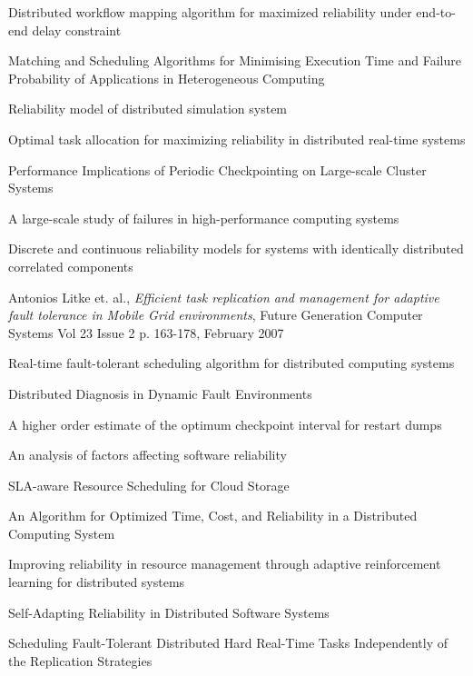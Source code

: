 \documentclass{cslthse-msc}
\begin{document}
\begin{thebibliography}{50}
Distributed workflow mapping algorithm for maximized reliability under end-to-end delay constraint

Matching and Scheduling Algorithms for Minimising Execution Time and Failure Probability of Applications in Heterogeneous Computing

Reliability model of distributed simulation system

Optimal task allocation for maximizing reliability in distributed real-time systems

Performance Implications of Periodic Checkpointing on Large-scale Cluster Systems

A large-scale study of failures in high-performance computing systems

Discrete and continuous reliability models for systems with identically distributed correlated components

	Antonios Litke et. al.,	
	\emph{Efficient task replication and management for adaptive fault tolerance in Mobile Grid environments},
	Future Generation Computer Systems Vol 23 Issue 2 p. 163-178,
	February 2007

Real-time fault-tolerant scheduling algorithm for distributed computing systems

Distributed Diagnosis in Dynamic Fault Environments

A higher order estimate of the optimum checkpoint interval for restart dumps

An analysis of factors affecting software reliability

SLA-aware Resource Scheduling for Cloud Storage

An Algorithm for Optimized Time, Cost, and Reliability in a Distributed Computing System

Improving reliability in resource management through adaptive reinforcement learning for distributed systems

Self-Adapting Reliability in Distributed Software Systems

Scheduling Fault-Tolerant Distributed Hard Real-Time Tasks Independently of the Replication Strategies


\end{thebibliography}
\end{document}
